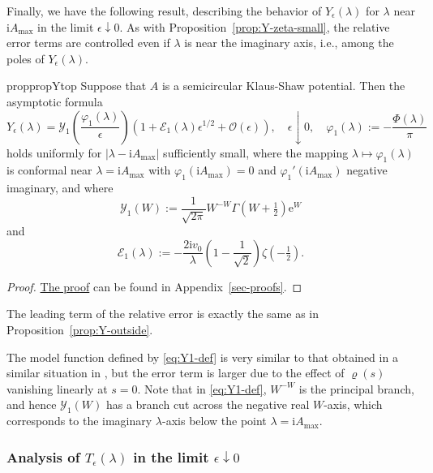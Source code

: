 \documentclass[12pt]{amsart}
\numberwithin{equation}{section}
\newcommand{\ee}{\mathrm{e}}
\newcommand{\ii}{\mathrm{i}}
\newcommand{\SP}{\lambda}
\newcommand{\phaseint}{\Phi}
\newcommand{\evdensity}{\varrho}
\def\eq{\begin{equation}}
\def\endeq{\end{equation}}
\begin{document}
Finally, we have the following result, describing the behavior of $Y_\epsilon(\SP)$ for $\SP$ near $\ii A_\mathrm{max}$ in the limit $\epsilon\downarrow 0$.  As with Proposition~\ref{prop:Y-zeta-small}, 
the relative error terms are controlled even if $\SP$ is near the imaginary axis, i.e., among the poles of $Y_\epsilon(\SP)$.  
\begin{restatable}[Asymptotic behavior of $Y_\epsilon(\SP)$ for $\SP\approx \ii A_{\max}$]{prop}{propYtop}
Suppose that $A$ is a semicircular Klaus-Shaw potential.
Then 
the asymptotic formula 
\eq
Y_\epsilon(\SP) = 
\mathcal{Y}_1\left(\frac{\varphi_1(\SP)}{\epsilon}\right)\left(1+\mathcal{E}_1(\SP)\epsilon^{1/2}+\mathcal{O}\left(\epsilon\right)\right),\quad\epsilon\downarrow 0,\quad \varphi_1(\SP):=-\frac{\phaseint(\SP)}{\pi}
\label{Y-near-iAmax}
\endeq
holds uniformly for $|\SP-\ii A_\mathrm{max}|$ sufficiently small, where the mapping $\SP\mapsto \varphi_1(\SP)$ is conformal near $\SP=\ii A_\mathrm{max}$ with $\varphi_1(\ii A_\mathrm{max})=0$ and $\varphi_1'(\ii A_\mathrm{max})$ negative imaginary, and where
\eq
\mathcal{Y}_1(W):=\frac{1}{\sqrt{2\pi}}W^{-W}\Gamma(W+\tfrac{1}{2})\ee^W
\label{eq:Y1-def}
\endeq
and
\begin{equation}
\mathcal{E}_1(\SP):=-\frac{2\ii v_0}{\SP}\left(1-\frac{1}{\sqrt{2}}\right)\zeta(-\tfrac{1}{2}).
\label{eq:E1-def}
\end{equation}
\label{prop:Y-zeta-near-iAmax}
\end{restatable}

\begin{proof}
\hyperlink{proof:Ytop}{The proof} can be found in Appendix~\ref{sec-proofs}.
\end{proof}

\begin{rem}
The leading term of the relative error is exactly the same as in Proposition~\ref{prop:Y-outside}.
\end{rem}
The model function defined by \eqref{eq:Y1-def} is very similar to that obtained in a similar situation in \cite[Proposition~4.3]{BaikKMM07}, but the error term is larger due to the effect of $\evdensity(s)$ vanishing linearly at $s=0$.  Note that in \eqref{eq:Y1-def}, $W^{-W}$ is the principal branch, and hence $\mathcal{Y}_1(W)$ has a branch cut across the negative real $W$-axis, which corresponds to the imaginary $\SP$-axis below the point $\SP=\ii A_\mathrm{max}$.

\subsubsection{Analysis of $T_\epsilon(\SP)$ in the limit $\epsilon\downarrow 0$}
\label{app:T}
\end{document}
